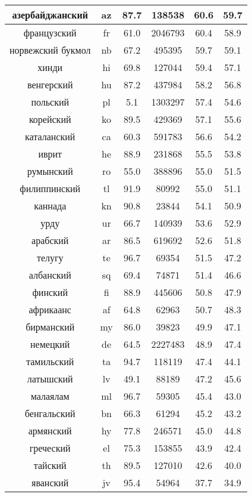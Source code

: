 \begin{table*}
{\begin{tabular}{|c|c|c||c|c|c|}
азербайджанский & az & 87.7 & 138538 & 60.6 & 59.7\\ \hline
французский & fr & 61.0 & 2046793 & 60.4 & 58.9\\ \hline
норвежский букмол & nb & 67.2 & 495395 & 59.7 & 59.1\\ \hline
хинди & hi & 69.8 & 127044 & 59.4 & 57.1\\ \hline
венгерский & hu & 87.2 & 437984 & 58.2 & 56.8\\ \hline
польский & pl & 5.1 & 1303297 & 57.4 & 54.6\\ \hline
корейский & ko & 89.5 & 429369 & 57.1 & 55.6\\ \hline
каталанский & ca & 60.3 & 591783 & 56.6 & 54.2\\ \hline
иврит & he & 88.9 & 231868 & 55.5 & 53.8\\ \hline
румынский & ro & 55.0 & 388896 & 55.0 & 51.5\\ \hline
филиппинский & tl & 91.9 & 80992 & 55.0 & 51.1\\ \hline
каннада & kn & 90.8 & 23844 & 54.1 & 50.9\\ \hline
урду & ur & 66.7 & 140939 & 53.6 & 52.9\\ \hline
арабский & ar & 86.5 & 619692 & 52.6 & 51.8\\ \hline
телугу & te & 96.7 & 69354 & 51.5 & 47.2\\ \hline
албанский & sq & 69.4 & 74871 & 51.4 & 46.6\\ \hline
финский & fi & 88.9 & 445606 & 50.8 & 47.9\\ \hline
африкаанс & af & 64.8 & 62963 & 50.7 & 48.3\\ \hline
бирманский & my & 86.0 & 39823 & 49.9 & 47.1\\ \hline
немецкий & de & 64.5 & 2227483 & 48.9 & 47.4\\ \hline
тамильский & ta & 94.7 & 118119 & 47.4 & 44.1\\ \hline
латышский & lv & 49.1 & 88189 & 47.2 & 45.6\\ \hline
малаялам & ml & 96.7 & 59305 & 45.4 & 43.0\\ \hline
бенгальский & bn & 66.3 & 61294 & 45.2 & 43.2\\ \hline
армянский & hy & 77.8 & 246571 & 45.0 & 44.8\\ \hline
греческий & el & 75.3 & 153855 & 43.9 & 42.4\\ \hline
тайский & th & 89.5 & 127010 & 42.6 & 40.0\\ \hline
яванский & jv & 95.4 & 54964 & 37.7 & 34.9\\ \hline

\end{tabular}}
\end{table*}
